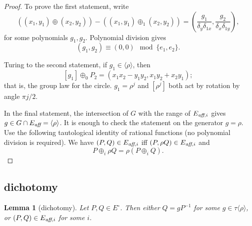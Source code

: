 \documentclass[12pt]{article}
\newtheorem{lemma}[theorem]{Lemma}
\newcommand{\op}[1]{\hbox{#1}}
\newcommand{\Eaff}{E_{\op{\scriptsize\it aff}}}
\newcommand{\Eaf}[1]{E_{\op{\scriptsize\it aff},{#1}}}
\newcommand{\Eoo}{E^{\circ}}
\newcommand{\ang}[1]{\langle{#1}\rangle}
\def\cong{\equiv}
\begin{document}
\begin{proof} To prove the first statement, write
\[
((x_1,y_1)\oplus (x_2,y_2)) -
((x_1,y_1)\oplus_1 (x_2,y_2) ) = 
(\frac{g_1}{\delta_y\delta_{1x}},\frac{g_2}{\delta_x\delta_{1y}}),
\]
for some polynomials $g_1,g_2$.   Polynomial division gives
\[
(g_1,g_2) \cong (0,0) \mod \{e_1,e_2\}.
\]

Turing to the second statement, if $g_1\in \ang{\rho}$, then
\[
[g_1]\oplus_0 P_2 = (x_1 x_2-y_1 y_2,x_1 y_2 + x_2 y_1);
\]
that is, the group law for the circle.  $g_1=\rho^j$ and $[\rho^j]$
both act by rotation by angle $\pi j/2$.

In the final statement, the intersection of $G$ with the range of
$\Eaf{i}$ gives $g\in G\cap \Eaff = \ang{\rho}$.  It is enough to
check the statement on the generator $g =\rho$.  Use the following
tautological identity of rational functions (no polynomial division is
required).  We have $(P,Q)\in \Eaf{i}$ iff $(P,\rho Q)\in \Eaf{i}$ and
\begin{equation}\label{eqn:rho-plus}
P\oplus_i \rho Q =  \rho(P\oplus_i Q).
\end{equation}
\end{proof}


\subsection{dichotomy}

\begin{lemma}[dichotomy]\label{lemma:noco} 
  Let $P,Q\in \Eoo$.  Then either $Q=g P^{-1}$ for some $g\in
  \tau\ang{\rho}$, or $(P,Q)\in \Eaf{i}$ for some $i$.
\end{lemma}
\end{document}
